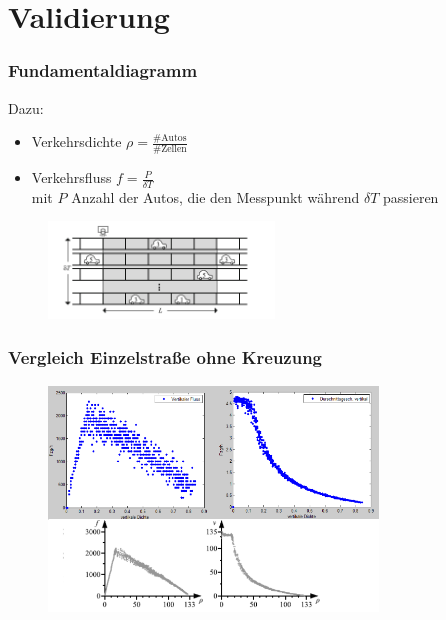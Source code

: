 \documentclass[hyperref={pdfpagelabels=false}, 12pt]{beamer}
\begin{document}
{\begin{frame}
\end{frame}

\section{Validierung}

\begin{frame}
	\frametitle{Fundamentaldiagramm}
	Dazu:
	\begin{itemize}
		\item Verkehrsdichte $\rho=\frac{\#\text{Autos}}{\#\text{Zellen}}$
		\item Verkehrsfluss $f = \frac{P}{\delta T}$ \\
	mit $P$ Anzahl der Autos, die den Messpunkt während $\delta T$ passieren
	\end{itemize}
	
	\begin{figure}[H]%
		\centering
		\includegraphics[width=6cm]{4_BestFD.png}%
	\end{figure}
\end{frame}

\begin{frame}
	\frametitle{Vergleich Einzelstraße ohne Kreuzung}
		\begin{figure}[H]%
		\centering
		\includegraphics[height=6cm]{4_FD_Vergleich.png}%
	\end{figure}
\end{frame}

}
\end{document}
